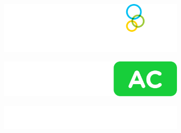 \begin{figure}[h]
\begin{center}
    \vspace*{1cm}
    \begin{subfigure}{0.2\textwidth}
        \centering
        \includegraphics[width=0.9\linewidth]{sponsor/white/startlinkw.png}
    \end{subfigure}
    \begin{subfigure}{0.2\textwidth}
        \centering
        \includegraphics[width=0.9\linewidth]{sponsor/white/solvedw.png}
    \end{subfigure}
    \begin{subfigure}{0.2\textwidth}
        \centering
        \includegraphics[width=0.87\linewidth]{sponsor/white/samsungw.png}
    \end{subfigure}


\end{center}
\end{figure}
